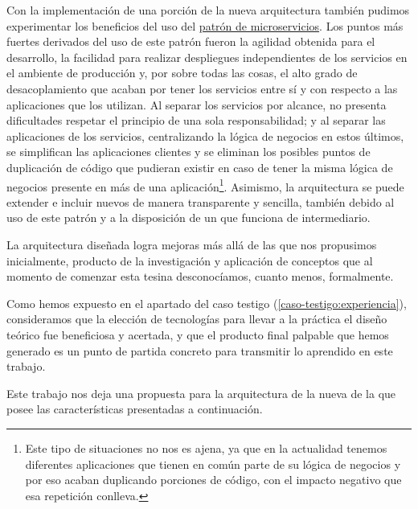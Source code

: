 Con la implementación de una porción de la nueva arquitectura también pudimos experimentar los beneficios del uso del \hyperref[microservicios]{patrón de microservicios}\cite[p.~27]{richards2015}. Los puntos más fuertes derivados del uso de este patrón fueron la agilidad obtenida para el desarrollo, la facilidad para realizar despliegues independientes de los servicios en el ambiente de producción y, por sobre todas las cosas, el alto grado de desacoplamiento que acaban por tener los servicios entre sí y con respecto a las aplicaciones que los utilizan. Al separar los servicios por alcance, no presenta dificultades respetar el principio de una sola responsabilidad; y al separar las aplicaciones de los servicios, centralizando la lógica de negocios en estos últimos, se simplifican las aplicaciones clientes y se eliminan los posibles puntos de duplicación de código que pudieran existir en caso de tener la misma lógica de negocios presente en más de una aplicación\footnote{Este tipo de situaciones no nos es ajena, ya que en la actualidad tenemos diferentes aplicaciones que tienen en común parte de su lógica de negocios y por eso acaban duplicando porciones de código, con el impacto negativo que esa repetición conlleva.}. Asimismo, la arquitectura se puede extender e incluir nuevos  de manera transparente y sencilla, también debido al uso de este patrón y a la disposición de un  que funciona de intermediario.

La arquitectura diseñada logra mejoras más allá de las que nos propusimos inicialmente, producto de la investigación y aplicación de conceptos que al momento de comenzar esta tesina desconocíamos, cuanto menos, formalmente.

Como hemos expuesto en el apartado \textit{} del caso testigo (\autoref{caso-testigo:experiencia}), consideramos que la elección de tecnologías para llevar a la práctica el diseño teórico fue beneficiosa y acertada, y que el producto final palpable que hemos generado es un punto de partida concreto para transmitir lo aprendido en este trabajo.

Este trabajo nos deja una propuesta para la arquitectura de la nueva {\cloud} de la {\unlp} que posee las características presentadas a continuación.

